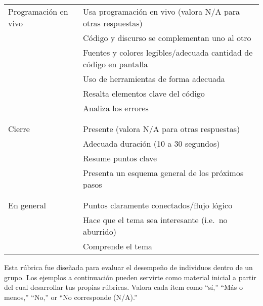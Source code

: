 \begin{longtable}{p{}p{}}
  Programación en vivo
  & Usa programación en vivo (valora N/A para otras respuestas) \\
  & Código y discurso se complementan uno al otro\\
  & Fuentes y colores legibles/adecuada cantidad de código en pantalla \\
  & Uso de herramientas de forma adecuada \\
  & Resalta elementos clave del código \\
  & Analiza los errores \\
  \\ [-1.5ex] \hline \\ [-1.5ex]

  Cierre
  & Presente (valora N/A para otras respuestas) \\
  & Adecuada duración (10 a 30 segundos) \\
  & Resume puntos clave \\
  & Presenta un esquema general de los próximos pasos \\
  \\ [-1.5ex] \hline \\ [-1.5ex]

  En general
  & Puntos claramente conectados/flujo lógico \\
  & Hace que el tema sea interesante (i.e.\ no aburrido) \\
  & Comprende el tema \\

\end{longtable}


Esta rúbrica fue diseñada para evaluar el desempeño de individuos dentro de un grupo. 
Los ejemplos a continuación pueden servirte como material inicial a partir del cual desarrollar tus propias rúbricas. 
Valora cada ítem como ``sí,'' ``Más o menos,'' ``No,'' or ``No corresponde (N/A).''

